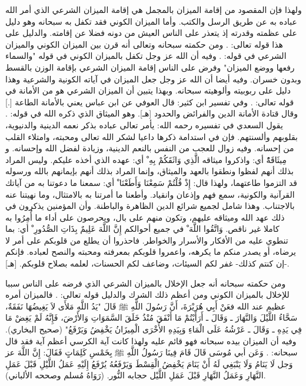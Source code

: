 ولهذا فإن المقصود من إقامة الميزان بالمجمل هي إقامة الميزان الشرعي الذي أمر الله عباده به عن طريق الرسل والكتب. وأما الميزان الكوني فقد تكفل به سبحانه وهو دليل على عظمته وقدرته إذ يتعذر على الناس العيش من دونه فضلا عن إقامته. والدليل على هذا قوله تعالى:
\quranayah*[35][41]{\footnotesize \surahname*[35]}. ومن حكمته سبحانه وتعالى أنه قرن بين الميزان الكوني والميزان الشرعي في قوله:
\quranayah*[55][7-9]{\footnotesize \surahname*[55]}. وفيه أن الله عز وجل تكفل بالميزان الكوني في قوله "والسماء رفعها ووضع الميزان" وفرض على الناس إقامة الميزان الشرعي بإقامة الوزن بالقسط وبدون خسران. وفيه أيضا أن الله عز وجل جعل الميزان في آياته الكونية والشرعية وهذا دليل على ربوبيته وألوهيته سبحانه. وبهذا يتبين أن الميزان الشرعي هو من الأمانة في قوله تعالى:
\quranayah*[33][72]{\footnotesize \surahname*[33]}. وفي تفسير ابن كثير: قال العوفي عن ابن عباس يعني بالأمانة الطاعة [.] وقال قتادة الأمانة الدين والفرائض والحدود [هـ]. وهو الميثاق الذي ذكره الله في قوله:
\quranayah*[5][7]{\footnotesize \surahname*[5]}. يقول السعدي في تفسيره رحمه الله:
يأمر تعالى عباده بذكر نعمه الدينية والدنيوية، بقلوبهم وألسنتهم. فإن في استدامة ذكرها داعيا لشكر الله تعالى ومحبته، وامتلاء القلب من إحسانه. وفيه زوال للعجب من النفس بالنعم الدينية، وزيادة لفضل الله وإحسانه. و { مِيثَاقَهُْ} أي: واذكروا ميثاقه { الَّذِي وَاثَقَكُمْ بِهِ ْ} أي: عهده الذي أخذه عليكم. وليس المراد بذلك أنهم لفظوا ونطقوا بالعهد والميثاق، وإنما المراد بذلك أنهم بإيمانهم بالله ورسوله قد التزموا طاعتهما، ولهذا قال: { إِذْ قُلْتُمْ سَمِعْنَا وَأَطَعْنَا ْ} أي: سمعنا ما دعوتنا به من آياتك القرآنية والكونية، سمع فهم وإذعان وانقياد. وأطعنا ما أمرتنا به بالامتثال، وما نهيتنا عنه بالاجتناب. وهذا شامل لجميع شرائع الدين الظاهرة والباطنة. وأن المؤمنين يذكرون في ذلك عهد الله وميثاقه عليهم، وتكون منهم على بال، ويحرصون على أداء ما أُمِرُوا به كاملا غير ناقص. { وَاتَّقُوا اللَّهَ ْ} في جميع أحوالكم { إِنَّ اللَّهَ عَلِيمٌ بِذَاتِ الصُّدُورِ ْ} أي: بما تنطوي عليه من الأفكار والأسرار والخواطر. فاحذروا أن يطلع من قلوبكم على أمر لا يرضاه، أو يصدر منكم ما يكرهه، واعمروا قلوبكم بمعرفته ومحبته والنصح لعباده. فإنكم -إن كنتم كذلك- غفر لكم السيئات، وضاعف لكم الحسنات، لعلمه بصلاح قلوبكم.
[هـ].

ومن حكمته سبحانه أنه جعل الإخلال بالميزان الشرعي الذي فرضه على الناس سببا للإخلال بالميزان الكوني ومن أعظم ذلك الشرك والدليل قوله تعالى:
\quranayah*[19][88-91]{\footnotesize \surahname*[19]}. فالميزان أمره عظيم عند الله فعَنْ أَبِي هُرَيْرَةَ، أَنَّ رَسُولَ اللَّهِ ﷺ قَالَ "يَدُ اللَّهِ مَلأَى لاَ يَغِيضُهَا نَفَقَةٌ، سَحَّاءُ اللَّيْلَ وَالنَّهَارَ ـ وَقَالَ ـ أَرَأَيْتُمْ مَا أَنْفَقَ مُنْذُ خَلَقَ السَّمَوَاتِ وَالأَرْضَ، فَإِنَّهُ لَمْ يَغِضْ مَا فِي يَدِهِ ـ وَقَالَ ـ عَرْشُهُ عَلَى الْمَاءِ وَبِيَدِهِ الأُخْرَى الْمِيزَانُ يَخْفِضُ وَيَرْفَعُ" {\footnotesize (صحيح البخاري)}. وفيه أن الميزان بيده سبحانه فهو قائم عليه ولهذا كانت آية الكرسي أعظم آية فقد قال سبحانه:
\quranayah*[2][255]{\footnotesize \surahname*[2]}. وَعَن أبي مُوسَى قَالَ قَامَ فِينَا رَسُولُ اللَّهِ ﷺ بِخَمْسِ كَلِمَاتٍ فَقَالَ: إِنَّ اللَّهَ عز وَجل لَا يَنَامُ وَلَا يَنْبَغِي لَهُ أَنْ يَنَامَ يَخْفِضُ الْقِسْطَ وَيَرْفَعُهُ يُرْفَعُ إِلَيْهِ عَمَلُ اللَّيْلِ قَبْلَ عَمَلِ النَّهَارِ وَعَمَلُ النَّهَارِ قَبْلَ عَمَلِ اللَّيْل حجابه النُّور. {\footnotesize (رَوَاهُ مُسلم وصححه الألباني)}.

